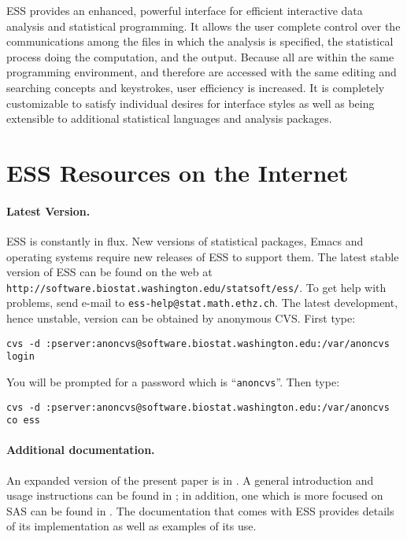 \documentclass{article}
\def\url#1{\stexttt{#1}} %
\newcommand{\stexttt}[1]{{\small\texttt{#1}}}
\begin{document}
ESS provides 
an enhanced, powerful interface for efficient interactive data
analysis and statistical programming.  
It allows the user complete control over the communications among the
files in which the analysis is specified, the statistical process doing
the computation, and the output.  Because all are within the same programming
environment, and therefore are accessed with the same
editing and searching concepts and keystrokes, user efficiency is increased.
It is completely customizable
to satisfy individual desires for interface styles as well as being
extensible to additional statistical languages and analysis packages.


\section*{ESS Resources on the Internet}
\label{sec:access}
\paragraph{Latest Version.}
ESS is constantly in flux.  New versions of statistical
packages, Emacs and operating systems require new releases of ESS to
support them.  The latest stable version of ESS can be found on the web at
\url{http://software.biostat.washington.edu/statsoft/ess/}.  To get help
with problems, send e-mail to \url{ess-help@stat.math.ethz.ch}.
The latest development, hence unstable, version can be obtained by
anonymous CVS.  First type:

  \stexttt{cvs -d :pserver:anoncvs@software.biostat.washington.edu:/var/anoncvs login}

  You will be prompted for a password which is ``\stexttt{anoncvs}''.  Then type: 

  \stexttt{cvs -d :pserver:anoncvs@software.biostat.washington.edu:/var/anoncvs co ess}
  

\paragraph{Additional documentation.} An expanded version of
the present paper is in
\citep{RMHHS:2001}.  A general introduction and usage instructions can
be found in \citep{heiberger:dsc:2001}; in addition, one which is more
focused on SAS can be found in \citep{heiberger:philasugi:2001}.  The
documentation that comes with ESS provides details of its
implementation as well as examples of its use.




\end{document}
